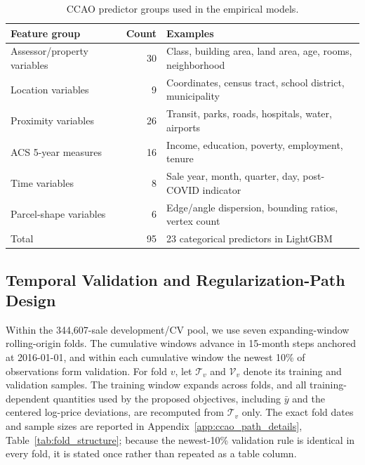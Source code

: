 \documentclass[10pt]{article}
\theoremstyle{definition}
\newcommand{\1}{\mathbf{1}}
\newcommand{\oldtext}[1]{\textcolor{blue}{\sout{#1}}}
\newcommand{\newtext}[1]{\textcolor{impGreen}{#1}}
\begin{document}
{
\begin{table}[!ht]
\centering
\caption{CCAO predictor groups used in the empirical models.}
\label{tab:feature_groups}
\begin{tabular}{lrl}
\toprule
Feature group & Count & Examples \\
\midrule
Assessor/property variables & 30 & Class, building area, land area, age, rooms, neighborhood \\
Location variables & 9 & Coordinates, census tract, school district, municipality \\
Proximity variables & 26 & Transit, parks, roads, hospitals, water, airports \\
ACS 5-year measures & 16 & Income, education, poverty, employment, tenure \\
Time variables & 8 & Sale year, month, quarter, day, post-COVID indicator \\
Parcel-shape variables & 6 & Edge/angle dispersion, bounding ratios, vertex count \\
\midrule
Total & 95 & 23 categorical predictors in LightGBM \\
\bottomrule
\end{tabular}
\end{table}
}


\subsection{Temporal Validation and Regularization-Path Design}
\label{subsec:path_design}

Within the 344,607-sale development/CV pool, we use seven expanding-window
rolling-origin folds. The cumulative windows advance in 15-month steps anchored at
2016-01-01, and within each cumulative window the newest 10\% of observations form
validation. For fold $v$, let $\mathcal T_v$ and $\mathcal V_v$ denote its training
and validation samples. The training window expands across folds, and all
training-dependent quantities used by the proposed objectives, including $\bar y$
and the centered log-price deviations, are recomputed from $\mathcal T_v$ only.
\newtext{The exact fold dates and sample sizes are reported in Appendix~\ref{app:ccao_path_details}, Table~\ref{tab:fold_structure}; because the newest-10\% validation rule is identical in every fold, it is stated once rather than repeated as a table column.}
\end{document}
